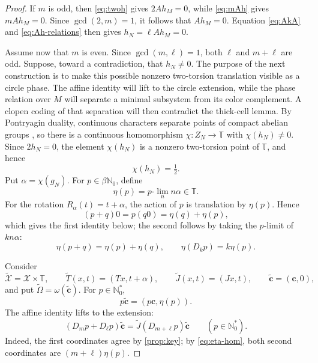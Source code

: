 \documentclass[reqno,12pt]{amsart}
\newcommand{\Nzero}{\mathbb N_0}
\newcommand{\Nstar}{\Nzero^{*}}
\newcommand{\Torus}{\mathbb T}
\numberwithin{equation}{section}
\begin{document}
\begin{proof}
If $m$ is odd, then \eqref{eq:twoh} gives
$2Ah_M=0$, while \eqref{eq:mAh} gives $mAh_M=0$. Since
$\gcd(2,m)=1$, it follows that $Ah_M=0$. Equation \eqref{eq:AkA} and 
\eqref{eq:Ah-relations} then gives $h_N=\ell Ah_M=0$.

Assume now that $m$ is even. Since $\gcd(m,\ell)=1$, both $\ell$ and
$m+\ell$ are odd. Suppose, toward a contradiction, that $h_N\neq0$.
The purpose of the next construction is to make this possible nonzero
two-torsion translation visible as a circle phase.  The affine identity
will lift to the circle extension, while the phase relation over $M$ will
separate a minimal subsystem from its color complement.  A clopen coding
of that separation will then contradict the thick-cell lemma.
By Pontryagin duality, continuous characters separate points of compact
abelian groups \cite[Theorem~1.7.2]{Rudin62}, so there is a continuous homomorphism
$\chi:Z_N\to\Torus$ with
$\chi(h_N)\neq0$. Since $2h_N=0$, the element $\chi(h_N)$ is a nonzero
two-torsion point of $\Torus$, and hence
\begin{equation}\label{eq:chi-h}
 \chi(h_N)=\tfrac12.
\end{equation}
Put $\alpha=\chi(g_N)$. For $p\in\beta\Nzero$, define
\[
 \eta(p)=p\text{-}\lim_n n\alpha\in\Torus.
\]
For the rotation $R_\alpha(t)=t+\alpha$, the action of $p$ is translation by
$\eta(p)$. Hence
\[
 (p+q)0=p(q0)=\eta(q)+\eta(p),
\]
which gives the first identity below; the second follows by taking the
$p$-limit of $kn\alpha$:
\begin{equation}\label{eq:eta-hom}
 \eta(p+q)=\eta(p)+\eta(q),
 \qquad
 \eta(D_k p)=k\eta(p).
\end{equation}

Consider
\[
 \widetilde{\mathcal X}=\mathcal X\times\Torus,
 \qquad
 \widetilde T(x,t)=(Tx,t+\alpha),
 \qquad
 \widetilde J(x,t)=(Jx,t),
 \qquad
 \widetilde{\mathbf c}=(\mathbf c,0),
\]
and put $\widetilde\Omega=\omega(\widetilde{\mathbf c})$. For
$p\in\Nstar$,
\[
 p\widetilde{\mathbf c}=(p\mathbf c,\eta(p)).
\]
The affine identity lifts to the extension:
\begin{equation}\label{eq:lifted-key}
 (D_m p+D_\ell p)\widetilde{\mathbf c}
 =\widetilde J(D_{m+\ell} p)\widetilde{\mathbf c}
 \qquad(p\in\Nstar).
\end{equation}
Indeed, the first coordinates agree by \cref{prop:key}; by
\eqref{eq:eta-hom}, both second coordinates are $(m+\ell)\eta(p)$.


\end{proof}
\end{document}
